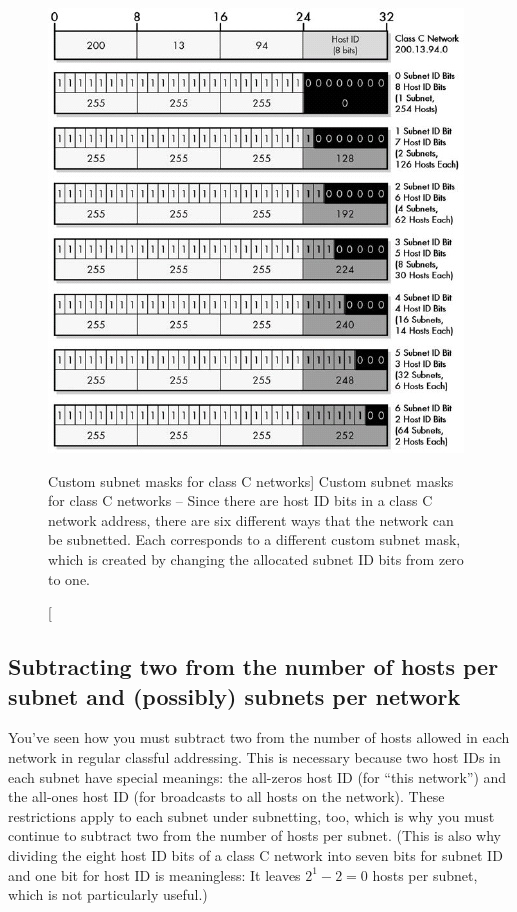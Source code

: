 \begin{figure}
   \centering
   \includegraphics[width=\textwidth]{images/custom-subnet-masks.jpg}
   \caption
      [Custom subnet masks for class C networks]
      {Custom subnet masks for class C networks --
      Since there are host ID bits in a class C network address, there are six different ways that the network can be subnetted.
      Each corresponds to a different custom subnet mask, which is created by changing the allocated subnet ID bits from zero to one.}
   \label{fig:custom-subnet-masks}
\end{figure}



\subsection{Subtracting two from the number of hosts per subnet and (possibly) subnets per network}

You've seen how you must subtract two from the number of hosts allowed
in each network in regular classful addressing. This is necessary
because two host IDs in each subnet have special meanings: the all-zeros
host ID (for ``this network'') and the all-ones host ID (for broadcasts to
all hosts on the network). These restrictions apply to each subnet under
subnetting, too, which is why you must continue to subtract two from the
number of hosts per subnet. (This is also why dividing the eight host ID
bits of a class C network into seven bits for subnet ID and one bit for
host ID is meaningless: It leaves $2^1-2=0$ hosts per subnet, which is not particularly useful.)

